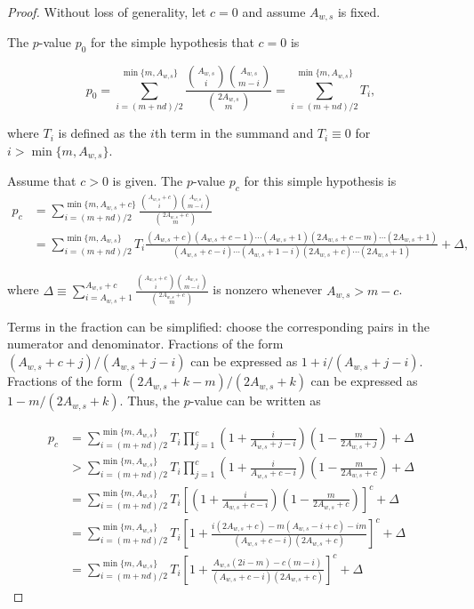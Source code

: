
\begin{proof}
Without loss of generality, let $c=0$ and assume $A_{w,s}$ is fixed.

The $p$-value $p_0$ for the simple hypothesis that $c=0$ is

\begin{equation}
  p_0 = \sum_{i = (m+nd)/2}^{\min\{m, A_{w,s}\}} \frac{ {A_{w,s} \choose i}{A_{w,s} \choose m-i} }{{2A_{w,s} \choose m}} =  \sum_{i = (m+nd)/2}^{\min\{m, A_{w,s}\}} T_i,
\end{equation}

where $T_i$ is defined as the $i$th term in the summand and $T_i \equiv 0$ for $i > \min\{m, A_{w,s}\}$.

Assume that $c>0$ is given.
The $p$-value $p_c$ for this simple hypothesis is
\begin{align*}
p_c &=   \sum_{i = (m+nd)/2}^{\min\{m, A_{w,s}+c\}} \frac{ {A_{w,s}+c \choose i}{A_{w,s} \choose m-i} }{{2A_{w,s}+c \choose m}}  \\
   &= \sum_{i = (m+nd)/2}^{\min\{m, A_{w,s}\}} T_i \frac{(A_{w,s} + c)(A_{w,s}+c-1)\cdots(A_{w,s}+1)(2A_{w,s}+c-m)\cdots(2A_{w,s}+1) }
   {(A_{w,s}+c-i)\cdots(A_{w,s}+1-i)(2A_{w,s}+c)\cdots(2A_{w,s}+1)} + \Delta,
\end{align*}

where $\Delta \equiv \sum_{i=A_{w,s}+1}^{A_{w,s}+c} \frac{ {A_{w,s}+c \choose i}{A_{w,s} \choose m-i} }{{2A_{w,s}+c \choose m}} $
 is nonzero whenever $A_{w,s} > m-c$.

Terms in the fraction can be simplified: choose the corresponding pairs in the numerator and denominator.
Fractions of the form $(A_{w,s}+c + j)/(A_{w,s}+j-i)$ can be expressed as $1 + i/(A_{w,s}+j-i)$.
Fractions of the form $(2A_{w,s}+k-m)/(2A_{w,s}+k)$ can be expressed as $1 - m/(2A_{w,s}+k)$.
Thus, the $p$-value can be written as 

\begin{align*}
p_c &= \sum_{i = (m+nd)/2}^{\min\{m, A_{w,s}\}} T_i \prod_{j=1}^c \left(1 + \frac{i}{A_{w,s} + j - i}\right)\left(1 - \frac{m}{2A_{w,s}+j}\right)  + \Delta\\
&> \sum_{i = (m+nd)/2}^{\min\{m, A_{w,s}\}} T_i \prod_{j=1}^c \left(1 + \frac{i}{A_{w,s} + c - i}\right)\left(1 - \frac{m}{2A_{w,s}+c}\right)  + \Delta\\
&= \sum_{i = (m+nd)/2}^{\min\{m, A_{w,s}\}} T_i \left[ \left(1 + \frac{i}{A_{w,s} + c - i}\right)\left(1 - \frac{m}{2A_{w,s}+c}\right) \right]^c + \Delta \\
&= \sum_{i = (m+nd)/2}^{\min\{m, A_{w,s}\}} T_i \left[ 1 + \frac{i(2A_{w,s}+c) - m(A_{w,s}-i+c) - im}{(A_{w,s} + c - i)(2A_{w,s}+c)} \right]^c  + \Delta\\
&= \sum_{i = (m+nd)/2}^{\min\{m, A_{w,s}\}} T_i \left[ 1 + \frac{A_{w,s}(2i-m) - c(m-i)}{(A_{w,s} + c - i)(2A_{w,s}+c)} \right]^c  + \Delta
\end{align*}


\end{proof}
